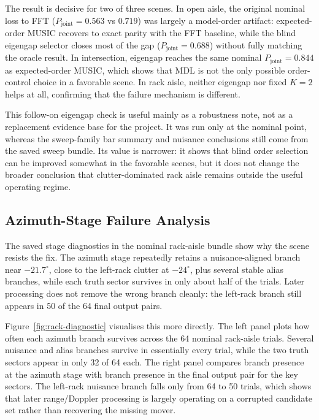 \documentclass[11pt]{article}
\newcommand{\pjoint}{P_{\mathrm{joint}}}
\begin{document}
The result is decisive for two of three scenes. In open aisle, the original nominal loss to FFT ($\pjoint = 0.563$ vs $0.719$) was largely a model-order artifact: expected-order MUSIC recovers to exact parity with the FFT baseline, while the blind eigengap selector closes most of the gap ($\pjoint = 0.688$) without fully matching the oracle result. In intersection, eigengap reaches the same nominal $\pjoint = 0.844$ as expected-order MUSIC, which shows that MDL is not the only possible order-control choice in a favorable scene. In rack aisle, neither eigengap nor fixed $K=2$ helps at all, confirming that the failure mechanism is different.

This follow-on eigengap check is useful mainly as a robustness note, not as a replacement evidence base for the project. It was run only at the nominal point, whereas the sweep-family bar summary and nuisance conclusions still come from the saved sweep bundle. Its value is narrower: it shows that blind order selection can be improved somewhat in the favorable scenes, but it does not change the broader conclusion that clutter-dominated rack aisle remains outside the useful operating regime.

\subsection{Azimuth-Stage Failure Analysis}

The saved stage diagnostics in the nominal rack-aisle bundle show why the scene resists the fix. The azimuth stage repeatedly retains a nuisance-aligned branch near $-21.7^\circ$, close to the left-rack clutter at $-24^\circ$, plus several stable alias branches, while each truth sector survives in only about half of the trials. Later processing does not remove the wrong branch cleanly: the left-rack branch still appears in 50 of the 64 final output pairs.

Figure~\ref{fig:rack-diagnostic} visualises this more directly. The left panel plots how often each azimuth branch survives across the 64 nominal rack-aisle trials. Several nuisance and alias branches survive in essentially every trial, while the two truth sectors appear in only 32 of 64 each. The right panel compares branch presence at the azimuth stage with branch presence in the final output pair for the key sectors. The left-rack nuisance branch falls only from 64 to 50 trials, which shows that later range/Doppler processing is largely operating on a corrupted candidate set rather than recovering the missing mover.
\end{document}
